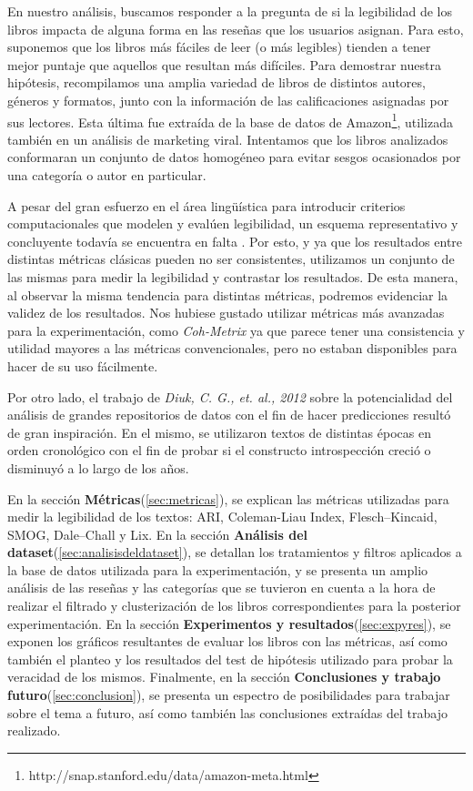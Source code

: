 \documentclass[12pt,journal,compsoc]{IEEEtran}
\begin{document}
En nuestro análisis, buscamos responder a la pregunta de si la legibilidad de los libros impacta de alguna forma en las reseñas que los usuarios asignan. Para esto, suponemos que los libros más fáciles de leer (o más legibles) tienden a tener mejor puntaje que aquellos que resultan más difíciles. Para demostrar nuestra hipótesis, recompilamos una amplia variedad de libros de distintos autores, géneros y formatos, junto con la información de las calificaciones asignadas por sus lectores. Esta última fue extraída de la base de datos de Amazon\footnote{http://snap.stanford.edu/data/amazon-meta.html}, utilizada también en un análisis de marketing viral\cite{leskovec}. Intentamos que los libros analizados conformaran un conjunto de datos homogéneo para evitar sesgos ocasionados por una categoría o autor en particular.

A pesar del gran esfuerzo en el área lingüística para introducir criterios computacionales que modelen y evalúen legibilidad, un esquema representativo y concluyente todavía se encuentra en falta \cite{orlow, klare, kanungo, karmakar}. Por esto, y ya que los resultados entre distintas métricas clásicas pueden no ser consistentes\cite{izgi}, utilizamos un conjunto de las mismas para medir la legibilidad y contrastar los resultados. De esta manera, al observar la misma tendencia para distintas métricas, podremos evidenciar la validez de los resultados. Nos hubiese gustado utilizar métricas más avanzadas para la experimentación, como \textit{Coh-Metrix}\cite{graesser} ya que parece tener una consistencia y utilidad mayores a las métricas convencionales\cite{crossley}, pero no estaban disponibles para hacer de su uso fácilmente.

Por otro lado, el trabajo de \textit{Diuk, C. G., et. al., 2012} \cite{diuk} sobre la potencialidad del análisis de grandes repositorios de datos con el fin de hacer predicciones resultó de gran inspiración. En el mismo, se utilizaron textos de distintas épocas en orden cronológico con el fin de probar si el constructo introspección creció o disminuyó a lo largo de los años. %

En la sección \textbf{Métricas}(\ref{sec:metricas}), se explican las métricas utilizadas para medir la legibilidad de los textos: ARI, Coleman-Liau Index, Flesch–Kincaid, SMOG, Dale–Chall y Lix. En la sección \textbf{Análisis del dataset}(\ref{sec:analisisdeldataset}), se detallan los tratamientos y filtros aplicados a la base de datos utilizada para la experimentación, y se presenta un amplio análisis de las reseñas y las categorías que se tuvieron en cuenta a la hora de realizar el filtrado y clusterización de los libros correspondientes para la posterior experimentación. En la sección \textbf{Experimentos y resultados}(\ref{sec:expyres}), se exponen los gráficos resultantes de evaluar los libros con las métricas, así como también el planteo y los resultados del test de hipótesis utilizado para probar la veracidad de los mismos. Finalmente, en la sección \textbf{Conclusiones y trabajo futuro}(\ref{sec:conclusion}), se presenta un espectro de posibilidades para trabajar sobre el tema a futuro, así como también las conclusiones extraídas del trabajo realizado.
\end{document}
